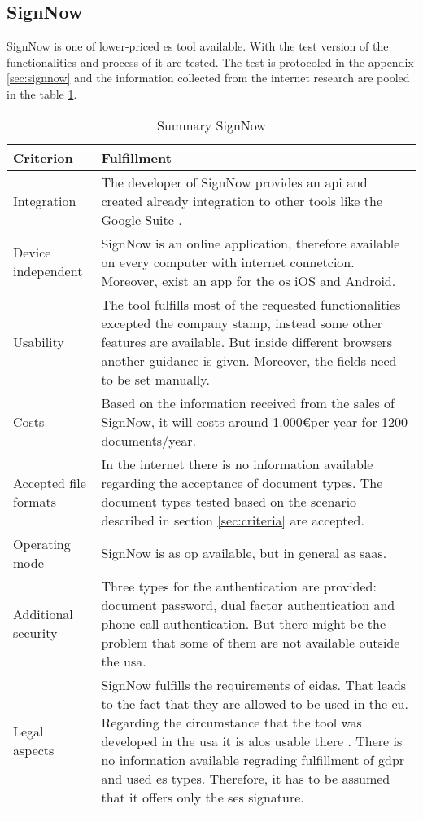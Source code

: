 \subsection{SignNow}
SignNow is one of lower-priced \gls{es} tool available. With the test version of the functionalities and process of it are tested. The test is protocoled in the appendix \ref{sec:signnow} and the information collected from the internet research are pooled in the table \ref{tab:signnow}.
	\begin{longtable}{|p{4cm}|p{10cm}|} \hline
		Criterion & Fulfillment \\ \hline
		Integration & The developer of SignNow provides an \gls{api} and created already integration to other tools like the Google Suite \parencite{signnow2018enterprise,signnow2018price}.\\ \hline
		Device independent & SignNow is an online application, therefore available on every computer with internet connetcion. Moreover, exist an \gls{app} for the \gls{os} iOS and Android.\\ \hline
		Usability & The tool fulfills most of the requested functionalities excepted the company stamp, instead some other features are available. But inside different browsers another guidance is given. Moreover, the fields need to be set manually.\\ \hline
		Costs & Based on the information received from the sales of SignNow, it will costs around 1.000\euro per year for 1200 documents/year.\\ \hline
		Accepted file formats & In the internet there is no information available regarding the acceptance of document types. The document types tested based on the scenario described in section \ref{sec:criteria} are accepted.\\ \hline
		Operating mode & SignNow is as \gls{op} available, but in general as \gls{saas}. \parencite{signnow2018op} \\ \hline
		Additional security & Three types for the authentication are provided: document password, dual factor authentication and phone call authentication. But there might be the problem that some of them are not available outside the \gls{usa}. \parencite{signnow2018security} \\ \hline
		Legal aspects & SignNow fulfills the requirements of \gls{eidas}. That leads to the fact that they are allowed to be used in the \gls{eu}. Regarding the circumstance that the tool was developed in the \gls{usa} it is alos usable there \parencite{signnow2018legal}. There is no information available regrading fulfillment of \gls{gdpr} and used \gls{es} types. Therefore, it has to be assumed that it offers only the \gls{ses} signature. \\ \hline
	\caption{Summary SignNow}
	\label{tab:signnow}
	\end{longtable}

